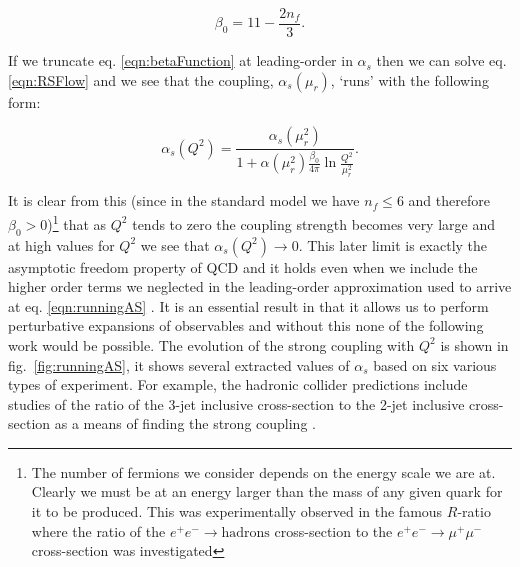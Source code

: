 	\begin{equation}
		\beta_0 = 11 - \frac{2n_f}{3}.
	\end{equation}

	If we truncate eq. \eqref{eqn:betaFunction} at leading-order in $\alpha_s$ then we can solve eq. \eqref{eqn:RSFlow}
	and we see that the coupling, $\alpha_s(\mu_r)$, `runs' with the following form:

	\begin{equation}
		\alpha_s(Q^2) = \frac{\alpha_s(\mu_r^2)}{1 + \alpha(\mu_r^2)\frac{\beta_0}{4\pi}\ln\frac{Q^2}{\mu_r^2}}.
		\label{eqn:runningAS}
	\end{equation}

	It is clear from this (since in the standard model we have $n_f\leq6$ and therefore $\beta_0>0$)\footnote{The number of
	fermions we consider depends on the energy scale we are at. Clearly we must be at an energy larger than the mass of any
	given quark for it to be produced.  This was experimentally observed in the famous $R$-ratio where the ratio of the
	$e^+e^-\rightarrow \text{hadrons}$ cross-section to the $e^+e^-\rightarrow\mu^+\mu^-$ cross-section was investigated}
	that as $Q^2$ tends to zero the coupling strength becomes very large and at high values for $Q^2$ we see that $\alpha_s(Q^2)\rightarrow0$.
	This later limit is exactly the asymptotic freedom property of QCD and it holds even when we include the higher order
	terms we neglected in the leading-order approximation used to arrive at eq. \eqref{eqn:runningAS} \cite{Beringer:1900zz}.
	It is an essential result in that it allows us to perform perturbative expansions of observables and without this none of the
	following work would be possible.  The evolution of the strong coupling with $Q^2$ is shown in fig.~\eqref{fig:runningAS},
	it shows several extracted values of $\alpha_s$ based on six various types of experiment.  For example, the hadronic
	collider predictions include studies of the ratio of the 3-jet inclusive cross-section to the 2-jet inclusive
	cross-section as a means of finding the strong coupling \cite{Chatrchyan:2013txa}.

